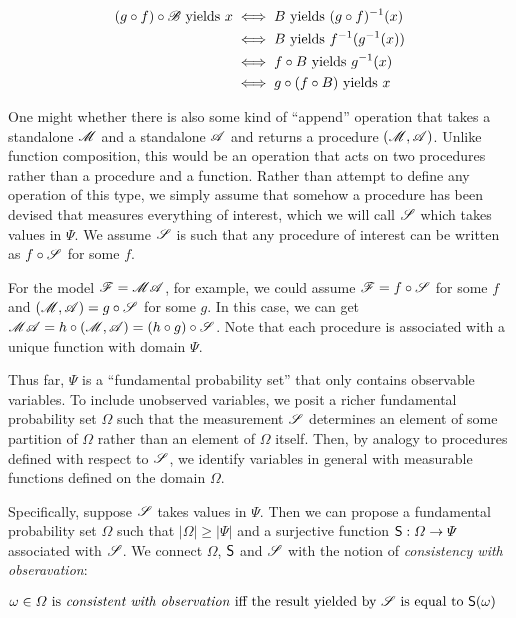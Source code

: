 \begin{align}
	(g\circ f)\circ\mathscr{B}\text{ yields } x &\iff B\text{ yields } (g\circ f)^{-1}(x) \\
	&\iff B\text{ yields } f^{-1}(g^{-1}(x))\\
	&\iff f\circ B \text{ yields } g^{-1}(x)\\
	&\iff g\circ(f\circ B)\text{ yields } x
\end{align}


One might whether there is also some kind of ``append'' operation that takes a standalone $\mathscr{M}$ and a standalone $\mathscr{A}$ and returns a procedure $(\mathscr{M},\mathscr{A})$. Unlike function composition, this would be an operation that acts on two procedures rather than a procedure and a function. Rather than attempt to define any operation of this type, we simply assume that somehow a procedure has been devised that measures everything of interest, which we will call $\mathscr{S}$ which takes values in $\Psi$. We assume $\mathscr{S}$ is such that any procedure of interest can be written as $f\circ \mathscr{S}$ for some $f$.

For the model $\mathscr{F}=\mathscr{MA}$, for example, we could assume $\mathscr{F}=f\circ \mathscr{S}$ for some $f$ and $(\mathscr{M},\mathscr{A})=g\circ \mathscr{S}$ for some $g$. In this case, we can get $\mathscr{MA}=h\circ(\mathscr{M},\mathscr{A})=(h\circ g)\circ\mathscr{S}$. Note that each procedure is associated with a unique function with domain $\Psi$.

Thus far, $\Psi$ is a ``fundamental probability set'' that only contains observable variables. To include unobserved variables, we posit a richer fundamental probability set $\Omega$ such that the measurement $\mathscr{S}$ determines an element of some partition of $\Omega$ rather than an element of $\Omega$ itself. Then, by analogy to procedures defined with respect to $\mathscr{S}$, we identify variables in general with measurable functions defined on the domain $\Omega$. 

Specifically, suppose $\mathscr{S}$ takes values in $\Psi$. Then we can propose a fundamental probability set $\Omega$ such that $|\Omega|\geq |\Psi|$ and a surjective function $\mathsf{S}:\Omega\to \Psi$ associated with $\mathscr{S}$. We connect $\Omega$, $\mathsf{S}$ and $\mathscr{S}$ with the notion of \emph{consistency with obseravation}:

\begin{align}
 &\omega\in \Omega\text{ is \emph{consistent with observation} iff the result yielded by }\mathscr{S}\text{ is equal to }\mathsf{S}(\omega)\label{def:observable}
\end{align}

